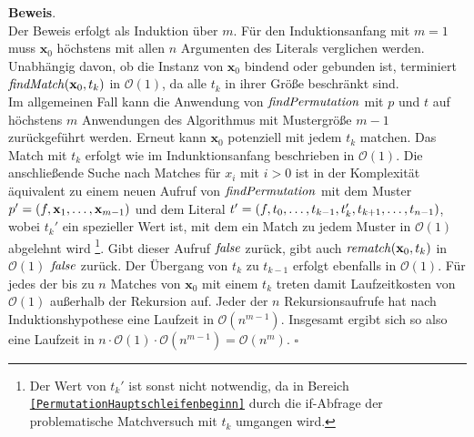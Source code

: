\textbf{Beweis}.\\
Der Beweis erfolgt als Induktion über $m$.
Für den Induktionsanfang mit $m = 1$ muss $\mathbf x_0$ höchstens mit allen $n$ Argumenten des Literals verglichen werden. Unabhängig davon, ob die Instanz von $\mathbf x_0$ bindend oder gebunden ist, terminiert $\mathit{findMatch}(\mathbf x_0, t_k)$ in $\mathcal O(1)$, da alle $t_k$ in ihrer Größe beschränkt sind. \\
Im allgemeinen Fall kann die Anwendung von $\mathit{findPermutation}$ mit $p$ und $t$ auf höchstens $m$ Anwendungen des Algorithmus mit Mustergröße $m-1$ zurückgeführt werden. Erneut kann $\mathbf x_0$ potenziell mit jedem $t_k$ matchen. Das Match mit $t_k$ erfolgt wie im Indunktionsanfang beschrieben in $\mathcal O (1)$. Die anschließende Suche nach Matches für $x_i$ mit $i > 0$ ist in der Komplexität äquivalent zu einem neuen Aufruf von $\mathit{findPermutation}$ mit dem Muster $p' = (f, {\mathbf x}_{1}, \dots, {\mathbf x}_{m-1})$ und dem Literal $t' = (f, {t}_{0}, \dots, {t}_{k-1}, t_k', {t}_{k+1}, \dots, {t}_{n-1})$, wobei $t_k'$ ein spezieller Wert ist, mit dem ein Match zu jedem Muster in $\mathcal O (1)$ abgelehnt wird \footnote{Der Wert von $t_k'$ ist sonst nicht notwendig, da in Bereich \texttt{\ref{PermutationHauptschleifenbeginn}} durch die if-Abfrage der problematische Matchversuch mit $t_k$ umgangen wird.}. Gibt dieser Aufruf $\mathit{false}$ zurück, gibt auch $\mathit{rematch}(\mathbf x_0, t_k)$ in $\mathcal O (1)$ $\mathit{false}$ zurück. Der Übergang von $t_k$ zu $t_{k-1}$ erfolgt ebenfalls in $\mathcal O (1)$. Für jedes der bis zu $n$ Matches von $\mathbf x_0$ mit einem $t_k$ treten damit Laufzeitkosten von $\mathcal O (1)$ außerhalb der Rekursion auf. Jeder der $n$ Rekursionsaufrufe hat nach Induktionshypothese eine Laufzeit in $\mathcal O (n^{m-1})$. Insgesamt ergibt sich so also eine Laufzeit in $n \cdot \mathcal O (1) \cdot \mathcal O (n^{m-1}) = \mathcal O (n^m)$.
\hfill $\square$\\


